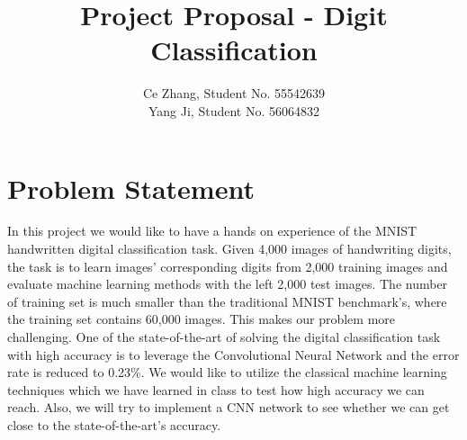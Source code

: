 \documentclass[12pt]{article}
\title{Project Proposal - Digit Classification}
\date{}
\author{\fontsize{12}{12}\selectfont Ce Zhang, Student No. 55542639\\
\fontsize{12}{12}\selectfont Yang Ji, Student No. 56064832}
\begin{document}
\maketitle
\section{\fontsize{12}{12}\selectfont Problem Statement}
In this project we would like to have a hands on experience of the MNIST handwritten digital classification task. Given 4,000 images of handwriting digits, the task is to learn images' corresponding digits from 2,000 training images and evaluate machine learning methods with the left 2,000 test images. The number of training set is much smaller than the traditional MNIST benchmark's, where the training set contains 60,000 images. This makes our problem more challenging. One of the state-of-the-art of solving the digital classification task with high accuracy is to leverage the Convolutional Neural Network \cite{cirecsan2012multi} and the error rate is reduced to 0.23\%. We would like to utilize the classical machine learning techniques which we have learned in class to test how high accuracy we can reach. Also, we will try to implement a CNN network to see whether we can get close to the state-of-the-art's accuracy.
\end{document}

